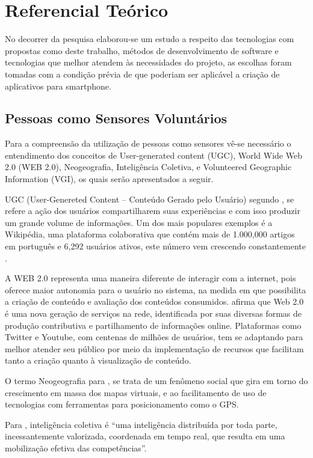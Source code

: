 \chapter{Referencial Teórico}
    No decorrer da pesquisa elaborou-se um estudo a respeito das tecnologias com propostas como deste trabalho, métodos de desenvolvimento de software e tecnologias que melhor atendem às necessidades do projeto, as escolhas foram tomadas com a condição prévia de que poderiam ser aplicável a criação de aplicativos para smartphone.


\section{Pessoas como Sensores Voluntários}
    Para a compreensão da utilização de pessoas como sensores vê-se necessário o entendimento dos conceitos de User-generated content (UGC), World Wide Web 2.0 (WEB 2.0), Neogeografia, Inteligência Coletiva, e Volunteered Geographic Information (VGI), os quais serão apresentados a seguir. 

    UGC (User-Genereted Content – Conteúdo Gerado pelo Usuário) segundo , se refere a ação dos usuários compartilharem suas experiências e com isso produzir um grande volume de informações. Um dos mais populares exemplos é a Wikipédia, uma plataforma colaborativa que contém mais de 1.000,000 artigos em português e 6,292 usuários ativos, este número vem crescendo constantemente \cite{Wikipedia2018}.

    A WEB 2.0 representa uma maneira diferente de interagir com a internet, pois oferece maior autonomia para o usuário no sistema, na medida em que possibilita a criação de conteúdo e avaliação dos conteúdos consumidos.  afirma que Web  2.0 é uma nova geração de serviços na rede, identificada por suas diversas formas de produção contributiva e partilhamento de informações online. Plataformas como Twitter e Youtube, com centenas de milhões de usuários, tem se adaptando para melhor atender seu público por meio da implementação de recursos que facilitam tanto a criação quanto à visualização de conteúdo. 

    O termo Neogeografia para , se trata de um fenômeno social que gira em torno do crescimento em massa dos mapas virtuais, e ao facilitamento de uso de tecnologias com ferramentas para posicionamento como o GPS.

   Para , inteligência coletiva é “uma inteligência distribuída por toda parte, incessantemente valorizada, coordenada em tempo real, que resulta em uma mobilização efetiva das competências”.

